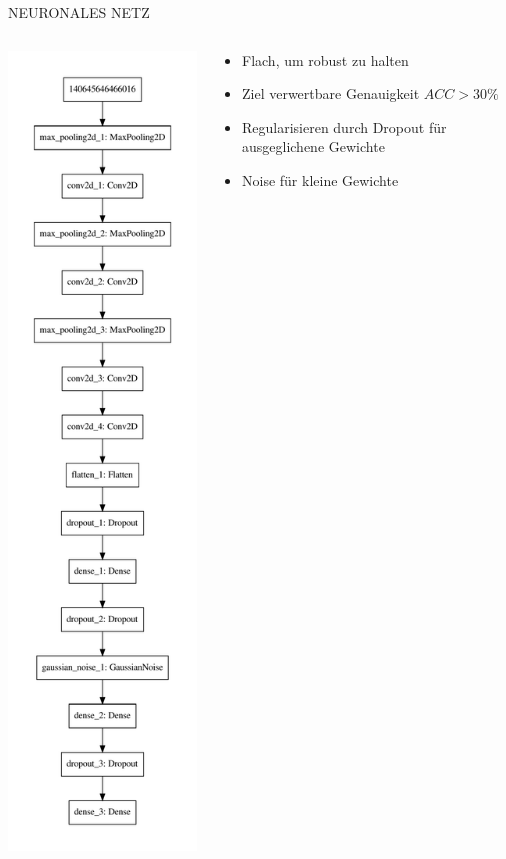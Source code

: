 \begin{frame}[t]{NEURONALES NETZ}
		\begin{columns}
				\begin{column}{0.4\textwidth}
						\centering
						\includegraphics[height=0.8\textheight]{content/model.pdf}
				\end{column}
				\begin{column}{0.6\textwidth}
						\begin{itemize}
								\item Flach, um robust zu halten
								\item Ziel verwertbare Genauigkeit $ACC > 30 \%$
								\item Regularisieren durch Dropout für
										ausgeglichene Gewichte
								\item Noise für kleine Gewichte
						\end{itemize}


\end{column}
\end{columns}
\end{frame}
